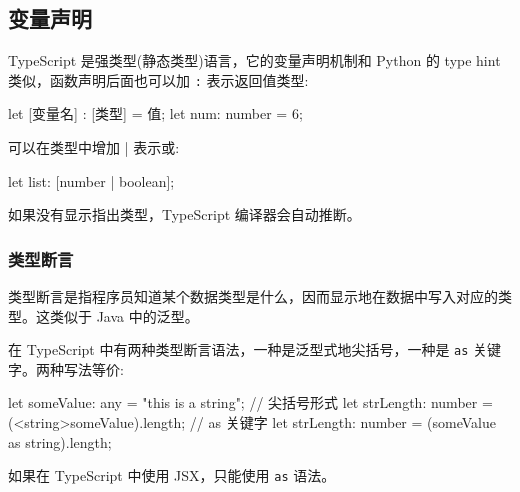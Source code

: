 \subsection{变量声明}

TypeScript 是强类型(静态类型)语言，它的变量声明机制和 Python 的 type hint 类似，函数声明后面也可以加 \texttt{:} 表示返回值类型:

\begin{TypeScript}
let [变量名] : [类型] = 值;
let num: number = 6;
\end{TypeScript}

可以在类型中增加 | 表示或:

\begin{TypeScript}
let list: [number | boolean];
\end{TypeScript}

如果没有显示指出类型，TypeScript 编译器会自动推断。

\subsubsection*{类型断言}

类型断言是指程序员知道某个数据类型是什么，因而显示地在数据中写入对应的类型。这类似于 Java 中的泛型。

在 TypeScript 中有两种类型断言语法，一种是泛型式地尖括号，一种是 \texttt{as} 关键字。两种写法等价:

\begin{TypeScript}
let someValue: any = "this is a string";
// 尖括号形式
let strLength: number = (<string>someValue).length;
// as 关键字
let strLength: number = (someValue as string).length;
\end{TypeScript}

如果在 TypeScript 中使用 JSX，只能使用 \texttt{as} 语法。

\newpage